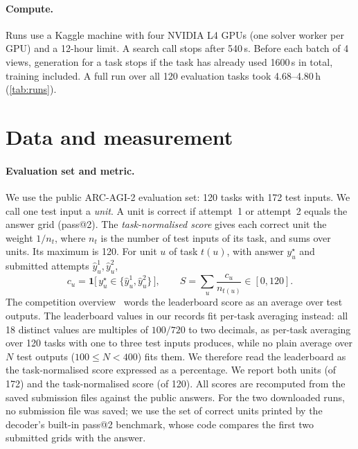 \documentclass[11pt]{article}
\begin{document}
\paragraph{Compute.}
Runs use a Kaggle machine with four NVIDIA L4 GPUs (one solver worker per GPU) and a 12-hour limit.
A search call stops after 540\,s. Before each batch of 4 views, generation for a task stops if the task has already used 1600\,s in total, training included. A full run over all 120 evaluation tasks took 4.68--4.80\,h (\cref{tab:runs}).

\section{Data and measurement}
\label{sec:data}

\paragraph{Evaluation set and metric.}
We use the public ARC-AGI-2 evaluation set: 120 tasks with 172 test inputs. We call one test input a \emph{unit}.
A unit is correct if attempt~1 or attempt~2 equals the answer grid (pass@2). The \emph{task-normalised score} gives each correct unit the weight $1/n_t$, where $n_t$ is the number of test inputs of its task, and sums over units. Its maximum is 120.
For unit $u$ of task $t(u)$, with answer $y^\star_u$ and submitted attempts $\hat y^{1}_u, \hat y^{2}_u$,
\begin{equation}
\label{eq:score}
c_u = \mathbf{1}\big[\,y^\star_u \in \{\hat y^{1}_u, \hat y^{2}_u\}\,\big], \qquad
S = \sum_{u} \frac{c_u}{n_{t(u)}} \in [0, 120] .
\end{equation}
The competition overview~\citep{arcprize2026kaggle} words the leaderboard score as an average over test outputs. The leaderboard values in our records fit per-task averaging instead: all 18 distinct values are multiples of $100/720$ to two decimals, as per-task averaging over 120 tasks with one to three test inputs produces, while no plain average over $N$ test outputs ($100 \le N < 400$) fits them. We therefore read the leaderboard as the task-normalised score expressed as a percentage.
We report both units (of 172) and the task-normalised score (of 120).
All scores are recomputed from the saved submission files against the public answers. For the two downloaded runs, no submission file was saved; we use the set of correct units printed by the decoder's built-in pass@2 benchmark, whose code compares the first two submitted grids with the answer.
\end{document}
